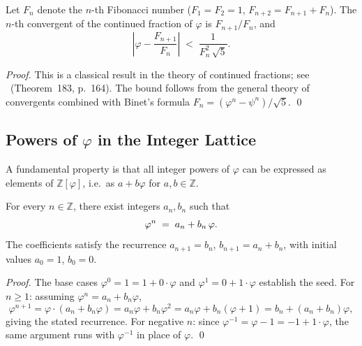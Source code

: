 \begin{lemma}\label{lem:fibonacci-convergents}
  Let $F_n$ denote the $n$-th Fibonacci number ($F_1 = F_2 = 1$,
  $F_{n+2} = F_{n+1} + F_n$).  The $n$-th convergent of the continued
  fraction of $\varphi$ is $F_{n+1}/F_n$, and
  \[
    \left|\varphi - \frac{F_{n+1}}{F_n}\right| \;<\; \frac{1}{F_n^{2}\,\sqrt{5}}.
  \]
\end{lemma}

\begin{proof}
  This is a classical result in the theory of continued fractions; see
  \cite{hardywright}~(Theorem~183, p.~164).  The bound follows from the
  general theory of convergents combined with Binet's formula
  $F_n = (\varphi^n - \psi^n)/\sqrt{5}$.  \qed
\end{proof}

\subsection{Powers of $\varphi$ in the Integer Lattice}

A fundamental property is that all integer powers of $\varphi$ can be
expressed as elements of $\mathbb{Z}[\varphi]$, i.e.\ as $a + b\varphi$
for $a, b \in \mathbb{Z}$.

\begin{lemma}\label{lem:phi-powers-Z}
  For every $n \in \mathbb{Z}$, there exist integers $a_n, b_n$ such that
  \[
    \varphi^{n} \;=\; a_n + b_n\,\varphi.
  \]
  The coefficients satisfy the recurrence $a_{n+1} = b_n$,
  $b_{n+1} = a_n + b_n$, with initial values $a_0 = 1$, $b_0 = 0$.
\end{lemma}

\begin{proof}
  The base cases $\varphi^0 = 1 = 1 + 0\cdot\varphi$ and
  $\varphi^1 = 0 + 1\cdot\varphi$ establish the seed.
  For $n \geq 1$: assuming $\varphi^n = a_n + b_n\varphi$,
  \[
    \varphi^{n+1} = \varphi \cdot (a_n + b_n\varphi)
    = a_n\varphi + b_n\varphi^2
    = a_n\varphi + b_n(\varphi+1)
    = b_n + (a_n + b_n)\varphi,
  \]
  giving the stated recurrence.  For negative $n$: since
  $\varphi^{-1} = \varphi - 1 = -1 + 1\cdot\varphi$, the same argument
  runs with $\varphi^{-1}$ in place of $\varphi$.  \qed
\end{proof}

